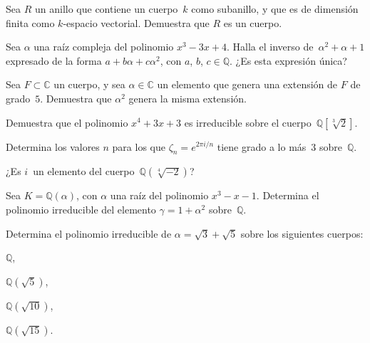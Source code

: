\documentclass[12pt]{article}
\begin{document}
    \begin{exercise}[15.1.1]
        Sea $R$ un anillo que contiene un cuerpo~$k$ como subanillo, y que es de dimensión finita como $k$-espacio vectorial. Demuestra que $R$ es un cuerpo.
    \end{exercise}
    
    \begin{exercise}[15.2.1]
        Sea $\alpha$ una raíz compleja del polinomio $x^{3}-3x+4$. Halla el inverso de~$\alpha^{2}+\alpha+1$ expresado de la forma $a+b \alpha+c \alpha^{2}$, con $a$, $b$, $c\in \mathbb{Q}$. ¿Es esta expresión única?
    \end{exercise}
    
    \begin{exercise}[15.3.1]
        Sea $F\subset\mathbb{C}$ un cuerpo, y sea $\alpha\in \mathbb{C}$ un elemento que genera una extensión de $F$ de grado~$5$. Demuestra que $\alpha^{2}$ genera la misma extensión.
    \end{exercise}
    
    \begin{exercise}[15.3.2]
        Demuestra que el polinomio $x^{4}+3x+3$ es irreducible sobre el cuerpo~$\mathbb{Q}[\sqrt[3]{2}]$.
    \end{exercise}
    
    \begin{exercise}[15.3.5]
        Determina los valores $n$ para los que $\zeta_{n}=e^{2 \pi i/n}$ tiene grado a lo más~$3$ sobre~$\mathbb{Q}$.
    \end{exercise}
    
    \begin{exercise}[15.3.7.a]
        ¿Es $i$~un elemento del cuerpo~$\mathbb{Q}(\sqrt[4]{-2})$?
    \end{exercise}
    
    \begin{exercise}[15.4.1]
        Sea $K=\mathbb{Q}(\alpha)$, con $\alpha$ una raíz del polinomio $x^{3}-x-1$. Determina el polinomio irreducible del elemento $\gamma=1+\alpha^{2}$ sobre~$\mathbb{Q}$.
    \end{exercise}
    
    \begin{exercise}[15.4.2]
        Determina el polinomio irreducible de $\alpha=\sqrt{3}+\sqrt{5}$ sobre los siguientes cuerpos:  
        
        \noindent
        \begin{inparaenum}[\bfseries(a)]
            \item $\mathbb{Q}$, 
            \item $\mathbb{Q}(\sqrt{5})$,
            \item $\mathbb{Q}(\sqrt{10})$,
            \item $\mathbb{Q}(\sqrt{15})$.
        \end{inparaenum}
    \end{exercise}
    
\end{document}
